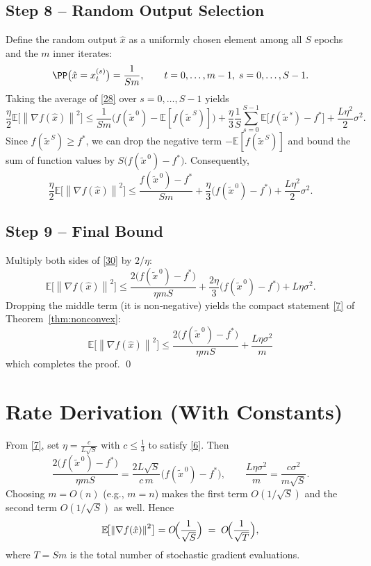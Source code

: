 \documentclass{article}
\newcommand{\EE}{\mathbb{E}}
\newcommand{\norm}[1]{\left\|#1\right\|}
\newcommand{\grad}{\nabla}
\begin{document}
\subsection*{Step 8 – Random Output Selection}
Define the random output $\hat{x}$ as a uniformly chosen element among all $S$ epochs and the $m$ inner iterates:
\[
\PP\bigl(\hat{x}=x_t^{(s)}\bigr)=\frac{1}{Sm},\qquad
t=0,\dots,m-1,\; s=0,\dots,S-1.
\]
Taking the average of \eqref{28} over $s=0,\dots,S-1$ yields
\[
\frac{\eta}{2}\EE\!\bigl[\norm{\grad f(\hat{x})}^{2}\bigr]
\le \frac{1}{Sm}\bigl(f(\tilde{x}^{\,0})- \EE[f(\tilde{x}^{\,S})]\bigr)
      +\frac{\eta}{3}\frac{1}{S}\sum_{s=0}^{S-1}\EE\!\bigl[f(\tilde{x}^{\,s})-f^{*}\bigr]
      +\frac{L\eta^{2}}{2}\sigma^{2}.
\tag{29}
\]
Since $f(\tilde{x}^{\,S})\ge f^{*}$, we can drop the negative term $- \EE[f(\tilde{x}^{\,S})]$ and bound the sum of function values by $S\bigl(f(\tilde{x}^{\,0})-f^{*}\bigr)$. Consequently,
\[
\frac{\eta}{2}\EE\!\bigl[\norm{\grad f(\hat{x})}^{2}\bigr]
\le \frac{f(\tilde{x}^{\,0})-f^{*}}{Sm}
      +\frac{\eta}{3}\bigl(f(\tilde{x}^{\,0})-f^{*}\bigr)
      +\frac{L\eta^{2}}{2}\sigma^{2}.
\tag{30}
\]

\subsection*{Step 9 – Final Bound}
Multiply both sides of \eqref{30} by $2/\eta$:
\[
\EE\!\bigl[\norm{\grad f(\hat{x})}^{2}\bigr]
\le \frac{2\bigl(f(\tilde{x}^{\,0})-f^{*}\bigr)}{\eta m S}
   +\frac{2\eta}{3}\bigl(f(\tilde{x}^{\,0})-f^{*}\bigr)
   +L\eta\sigma^{2}.
\tag{31}
\]
Dropping the middle term (it is non‑negative) yields the compact statement \eqref{7} of Theorem~\ref{thm:nonconvex}:
\[
\boxed{\;
\EE\!\bigl[\norm{\grad f(\hat{x})}^{2}\bigr]
\le
\frac{2\bigl(f(\tilde{x}^{\,0})-f^{*}\bigr)}{\eta m S}
   +\frac{L\eta\sigma^{2}}{m}\;}
\]
which completes the proof. \qed

\section*{Rate Derivation (With Constants)}
From \eqref{7}, set $\eta = \frac{c}{L\sqrt{S}}$ with $c\le \frac{1}{3}$ to satisfy \eqref{6}. Then
\[
\frac{2\bigl(f(\tilde{x}^{\,0})-f^{*}\bigr)}{\eta m S}
   = \frac{2L\sqrt{S}}{c\,m}\bigl(f(\tilde{x}^{\,0})-f^{*}\bigr),
\qquad
\frac{L\eta\sigma^{2}}{m}= \frac{c\sigma^{2}}{m\sqrt{S}}.
\]
Choosing $m=O(n)$ (e.g., $m=n$) makes the first term $O(1/\sqrt{S})$ and the second term $O(1/\sqrt{S})$ as well. Hence
\[
\EE\!\bigl[\norm{\grad f(\hat{x})}^{2}\bigr]=O\!\Bigl(\frac{1}{\sqrt{S}}\Bigr)
        \;=\;O\!\Bigl(\frac{1}{\sqrt{T}}\Bigr),
\]
where $T=Sm$ is the total number of stochastic gradient evaluations.
\end{document}
